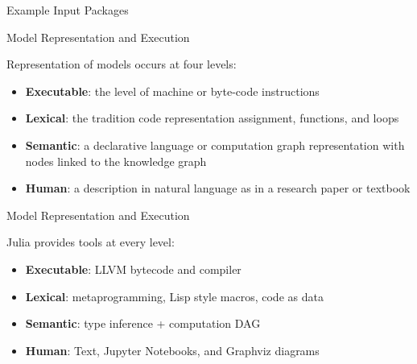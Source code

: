 \documentclass[ignorenonframetext,]{beamer}
\providecommand{\tightlist}{%
  \setlength{\itemsep}{0pt}\setlength{\parskip}{0pt}}
\begin{document}
\begin{frame}{Example Input Packages}
\protect\hypertarget{example-input-packages}{}


\end{frame}
\begin{frame}{Model Representation and Execution}
\protect\hypertarget{model-representation-and-execution}{}

Representation of models occurs at four levels:

\begin{itemize}
\item
  \textbf{Executable}: the level of machine or byte-code instructions
\item
  \textbf{Lexical}: the tradition code representation assignment,
  functions, and loops
\item
  \textbf{Semantic}: a declarative language or computation graph
  representation with nodes linked to the knowledge graph
\item
  \textbf{Human}: a description in natural language as in a research
  paper or textbook
\end{itemize}

\end{frame}

\begin{frame}{Model Representation and Execution}
\protect\hypertarget{model-representation-and-execution}{}

Julia provides tools at every level:

\begin{itemize}
\item
  \textbf{Executable}: LLVM bytecode and compiler
\item
  \textbf{Lexical}: metaprogramming, Lisp style macros, code as data 
\item
  \textbf{Semantic}: type inference + computation DAG
\item
  \textbf{Human}: Text, Jupyter Notebooks, and Graphviz diagrams
\end{itemize}

\end{frame}
\end{document}
